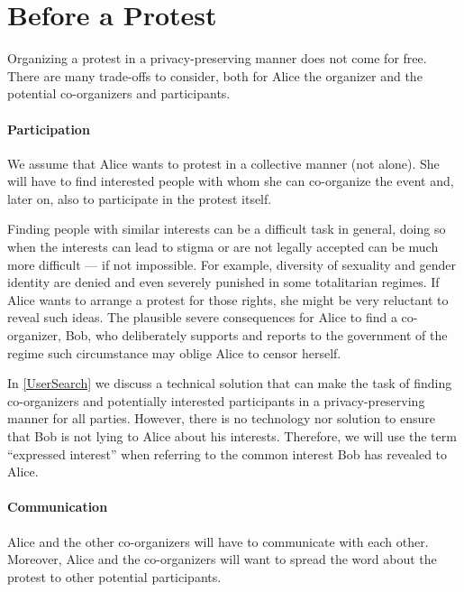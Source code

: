 \section{Before a Protest}
\label{BeforeProtest}

Organizing a protest in a privacy-preserving manner does not come for free.  
There are many trade-offs to consider, both for Alice the organizer and the 
potential co-organizers and participants.

\paragraph{Participation}

We assume that Alice wants to protest in a collective manner (not alone).
She will have to find interested people with whom she can co-organize the event
and, later on, also to participate in the protest itself.

Finding people with similar interests can be a difficult task in general, doing 
so when the interests can lead to stigma or are not legally accepted can be much more 
difficult --- if not impossible.
For example, diversity of sexuality and gender identity are denied and even 
severely punished in some totalitarian regimes.
If Alice wants to arrange a protest for those rights, she might be very 
reluctant to reveal such ideas.
The plausible severe consequences for Alice to find a co-organizer, Bob, who 
deliberately supports and reports to the government of the regime such 
circumstance may oblige Alice to censor herself. 

In \cref{UserSearch} we discuss a technical solution that can make the task of 
finding co-organizers and potentially interested participants in 
a privacy-preserving manner for all parties.
However, there is no technology nor solution to ensure that Bob is not lying to 
Alice about his interests.
Therefore, we will use the term \enquote{expressed interest} when referring to 
the common interest Bob has revealed to Alice.

\paragraph{Communication}

Alice and the other co-organizers will have to communicate with each other.
Moreover, Alice and the co-organizers will want to spread the word about the 
protest to other potential participants.

